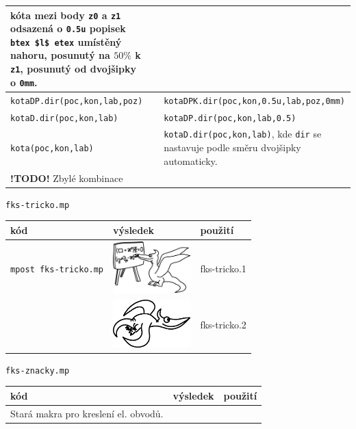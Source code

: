 \documentclass[a4paper,10pt]{article}
\begin{document}
\begin{tabularx}{\textwidth}{|l|l|X|}
	kóta mezi body \verb+z0+ a \verb+z1+ odsazená o \verb+0.5u+ popisek 
	\verb+btex $l$ etex+ umístěný nahoru, posunutý na $50\%$ k \verb+z1+,
	posunutý od dvojšipky o \verb+0mm+.\\\hline
    \verb+kotaDP.dir(poc,kon,lab,poz)+ &&
	\verb+kotaDPK.dir(poc,kon,0.5u,lab,poz,0mm)+\\\hline
    \verb+kotaD.dir(poc,kon,lab)+ &&
	\verb+kotaDP.dir(poc,kon,lab,0.5)+\\\hline
    \verb+kota(poc,kon,lab)+ &&
	\verb+kotaD.dir(poc,kon,lab)+, kde \verb+dir+ se nastavuje podle
	směru dvojšipky automaticky.\\\hline
    {\bf !TODO!} Zbylé kombinace&&\\\hline
\end{tabularx}\bigskip

{\centering\large\texttt{fks-tricko.mp}\nopagebreak\\\medskip\noindent}
\begin{tabularx}{\textwidth}{|l|l|X|}\hline
    kód & výsledek & použití\\\hline
    \verb+mpost fks-tricko.mp+ & \includegraphics[width=3cm]{fks-tricko_1} & 
	fks-tricko.1\\\hline
    & \includegraphics[width=3cm]{fks-tricko_2} & fks-tricko.2\\\hline
\end{tabularx}\bigskip

{\centering\large\texttt{fks-znacky.mp}\nopagebreak\\\medskip\noindent}
\begin{tabularx}{\textwidth}{|l|l|X|}\hline
    kód & výsledek & použití\\\hline
    Stará makra pro kreslení el. obvodů.&&\\\hline
\end{tabularx}\bigskip
\end{document}
